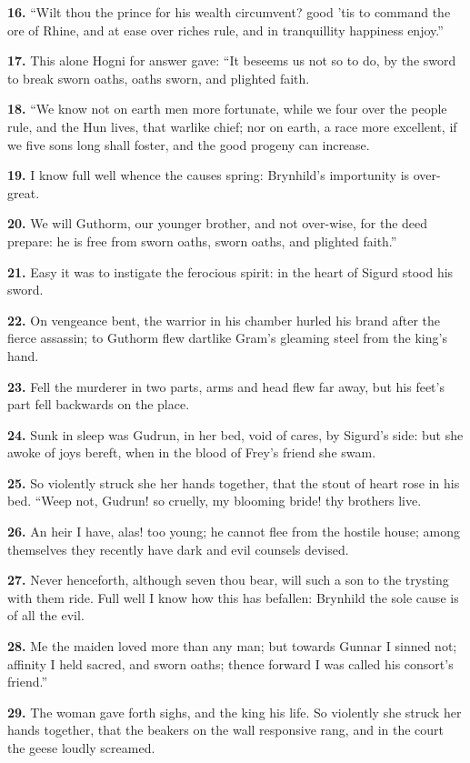 \textbf{16.} ``Wilt thou the prince for his wealth circumvent? good 'tis to
command the ore of Rhine, and at ease over riches rule, and in
tranquillity happiness enjoy.''

\textbf{17.} This alone Hogni for answer gave: ``It beseems us not so to do,
by the sword to break sworn oaths, oaths sworn, and plighted faith.

\textbf{18.} ``We know not on earth men more fortunate, while we four over the
people rule, and the Hun lives, that warlike chief; nor on earth, a
race more excellent, if we five sons long shall foster, and the good
progeny can increase.

\textbf{19.} I know full well whence the causes spring: Brynhild's
importunity is over-great.

\textbf{20.} We will Guthorm, our younger brother, and not over-wise, for the
deed prepare: he is free from sworn oaths, sworn oaths, and plighted
faith.''

\textbf{21.} Easy it was to instigate the ferocious spirit: in the heart of
Sigurd stood his sword.

\textbf{22.} On vengeance bent, the warrior in his chamber hurled his brand
after the fierce assassin; to Guthorm flew dartlike Gram's gleaming
steel from the king's hand.

\textbf{23.} Fell the murderer in two parts, arms and head flew far away, but
his feet's part fell backwards on the place.

\textbf{24.} Sunk in sleep was Gudrun, in her bed, void of cares, by Sigurd's
side: but she awoke of joys bereft, when in the blood of Frey's friend
she swam.

\textbf{25.} So violently struck she her hands together, that the stout of
heart rose in his bed. ``Weep not, Gudrun! so cruelly, my blooming
bride! thy brothers live.

\textbf{26.} An heir I have, alas! too young; he cannot flee from the hostile
house; among themselves they recently have dark and evil counsels
devised.

\textbf{27.} Never henceforth, although seven thou bear, will such a son to
the trysting with them ride. Full well I know how this has befallen:
Brynhild the sole cause is of all the evil.

\textbf{28.} Me the maiden loved more than any man; but towards Gunnar I
sinned not; affinity I held sacred, and sworn oaths; thence forward I
was called his consort's friend.''

\textbf{29.} The woman gave forth sighs, and the king his life. So violently
she struck her hands together, that the beakers on the wall responsive
rang, and in the court the geese loudly screamed.

